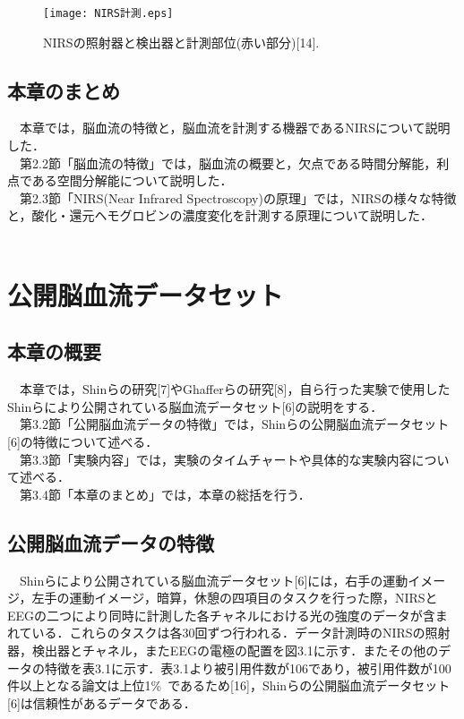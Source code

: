 \documentclass[a4j,12pt]{jreport}
\begin{document}
\begin{figure}[t]
  \begin{center}
    \texttt{[image: NIRS計測.eps]}
    \caption{NIRSの照射器と検出器と計測部位(赤い部分)[14].}
    \label{fig}
  \end{center}
\end{figure}

\section{本章のまとめ}
　本章では，脳血流の特徴と，脳血流を計測する機器であるNIRSについて説明した．\\
　第2.2節「脳血流の特徴」では，脳血流の概要と，欠点である時間分解能，利点である空間分解能について説明した．\\
　第2.3節「NIRS(Near Infrared Spectroscopy)の原理」では，NIRSの様々な特徴と，酸化・還元ヘモグロビンの濃度変化を計測する原理について説明した．\\
　
\chapter{公開脳血流データセット}
\section{本章の概要}
　本章では，Shinらの研究[7]やGhafferらの研究[8]，自ら行った実験で使用したShinらにより公開されている脳血流データセット[6]の説明をする．\\
　第3.2節「公開脳血流データの特徴」では，Shinらの公開脳血流データセット[6]の特徴について述べる．\\
　第3.3節「実験内容」では，実験のタイムチャートや具体的な実験内容について述べる．\\
　第3.4節「本章のまとめ」では，本章の総括を行う．\\

\section{公開脳血流データの特徴}
　Shinらにより公開されている脳血流データセット[6]には，右手の運動イメージ，左手の運動イメージ，暗算，休憩の四項目のタスクを行った際，NIRSとEEGの二つにより同時に計測した各チャネルにおける光の強度のデータが含まれている．これらのタスクは各30回ずつ行われる．データ計測時のNIRSの照射器，検出器とチャネル，またEEGの電極の配置を図3.1に示す．またその他のデータの特徴を表3.1に示す．表3.1より被引用件数が106であり，被引用件数が100件以上となる論文は上位1\%\ であるため[16]，Shinらの公開脳血流データセット[6]は信頼性があるデータである．\\
\end{document}
